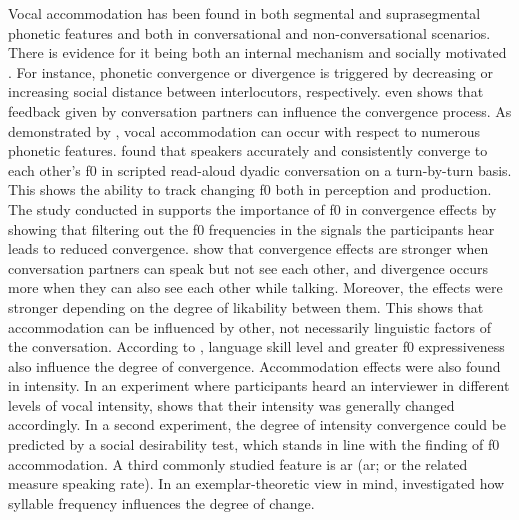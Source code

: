 Vocal accommodation has been found in both segmental \citep{Pardo2010conversational, Smith2007prosodic} and suprasegmental \citep{Walker2015repeat, Shockley2004imitation} phonetic features and
both in conversational \citep{Pardo2006phonetic, Lewandowski2012talent, Weise2018looking} and non-conversational \citep{Babel2014novelty, Shockley2004imitation} scenarios.
There is evidence for it being both an internal mechanism \citep{Pickering2004behavioral} and socially motivated \citep{Kim2011phonetic, Giles1991CAT, Babel2010dialect}.
For instance, phonetic convergence \citep{Giles1973mobility} or divergence \citep{Bourhis1977distinctiveness} is triggered by decreasing or increasing social distance between interlocutors, respectively.
 even shows that feedback given by conversation partners can influence the convergence process.
As demonstrated by \citet{Pardo2013measuring}, vocal accommodation can occur with respect to numerous phonetic features.
\citet{Aubanel2020speaking} found that speakers accurately and consistently converge to each other's \ac{f0} in scripted read-aloud dyadic conversation on a turn-by-turn basis.
This shows the ability to track changing \ac{f0} both in perception and production.
The study conducted in \citet{Babel2012role} supports the importance of \ac{f0} in convergence effects by showing that filtering out the \ac{f0} frequencies in the signals the participants hear leads to reduced convergence.
\citet{Schweitzer2017visibility} show that convergence effects are stronger when conversation partners can speak but not see each other, and divergence occurs more when they can also see each other while talking.
Moreover, the effects were stronger depending on the degree of likability between them.
This shows that accommodation can be influenced by other, not necessarily linguistic factors of the conversation.
According to \citet{Lehnert2020relationship}, language skill level and greater \ac{f0} expressiveness also influence the degree of convergence.
Accommodation effects were also found in intensity.
In an experiment where participants heard an interviewer in different levels of vocal intensity, \citet{Natale1975convergence} shows that their intensity was generally changed accordingly.
In a second experiment, the degree of intensity convergence could be predicted by a social desirability test, which stands in line with the finding of \ac{f0} accommodation.
A third commonly studied feature is \acl{ar} (\acs{ar}; or the related measure speaking rate).
In an exemplar-theoretic view in mind, \citet{Schweitzer2016exemplar} investigated how syllable frequency influences the degree of change.
